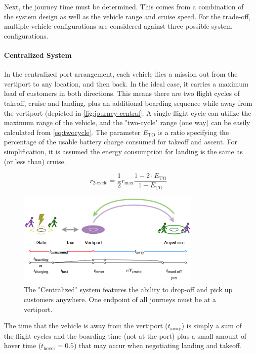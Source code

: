 Next, the journey time must be determined. This comes from a combination of the system design as well as the vehicle range and cruise speed. For the trade-off, multiple vehicle configurations are considered against three possible system configurations.

\paragraph{Centralized System}
In the centralized port arrangement, each vehicle flies a mission out from the vertiport to any location, and then back. In the ideal case, it carries a maximum load of customers in both directions. This means there are two flight cycles of takeoff, cruise and landing, plus an additional boarding sequence while away from the vertiport (depicted in \autoref{fig:journey-central}. A single flight cycle can utilize the maximum range of the vehicle, and the "two-cycle" range (one way) can be easily calculated from \autoref{eq:twocycle}. The parameter $E_\text{TO}$ is a ratio specifying the percentage of the usable battery charge consumed for takeoff and ascent. For simplification, it is assumed the energy consumption for landing is the same as (or less than) cruise.

\begin{equation}\label{eq:twocycle}
    r_\text{2-cycle} = \frac{1}{2}r_\text{max}\frac{1 - 2\cdot E_\text{TO}}{1 - E_\text{TO}}
\end{equation}

\begin{figure}[h]
    \centering
    \includegraphics[width=0.8\textwidth]{Figures/journey-Central.png}
    \captionsetup{justification=centering}
    \caption{The "Centralized" system features the ability to drop-off and pick up customers anywhere. One endpoint of all journeys must be at a vertiport.}
    \label{fig:journey-central}
\end{figure}

The time that the vehicle is away from the vertiport ($t_\text{away}$) is simply a sum of the flight cycles and the boarding time (not at the port) plus a small amount of hover time ($t_\text{hover}=0.5$) that may occur when negotiating landing and takeoff.

